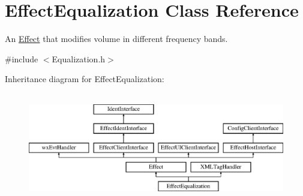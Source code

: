 \hypertarget{class_effect_equalization}{}\section{Effect\+Equalization Class Reference}
\label{class_effect_equalization}


An \hyperlink{class_effect}{Effect} that modifies volume in different frequency bands.  




{\ttfamily \#include $<$Equalization.\+h$>$}

Inheritance diagram for Effect\+Equalization\+:\begin{figure}[H]
\begin{center}
\leavevmode
\includegraphics[height=4.794520cm]{class_effect_equalization}
\end{center}
\end{figure}

